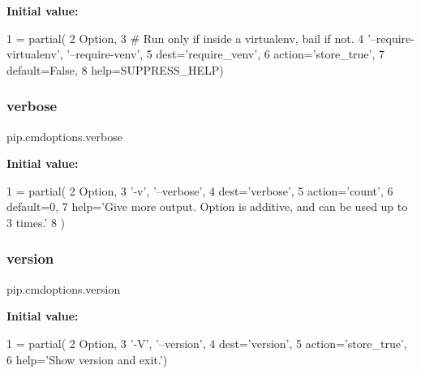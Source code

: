 {\bfseries Initial value\+:}
\begin{DoxyCode}
1 =  partial(
2     Option,
3     \textcolor{comment}{# Run only if inside a virtualenv, bail if not.}
4     \textcolor{stringliteral}{'--require-virtualenv'}, \textcolor{stringliteral}{'--require-venv'},
5     dest=\textcolor{stringliteral}{'require\_venv'},
6     action=\textcolor{stringliteral}{'store\_true'},
7     default=\textcolor{keyword}{False},
8     help=SUPPRESS\_HELP)
\end{DoxyCode}
\mbox{\label{namespacepip_1_1cmdoptions_a571cf3fd897e4144f1f3fff1e586f8bf}} 
\subsubsection{\texorpdfstring{verbose}{verbose}}
{\footnotesize\ttfamily pip.\+cmdoptions.\+verbose}

{\bfseries Initial value\+:}
\begin{DoxyCode}
1 =  partial(
2     Option,
3     \textcolor{stringliteral}{'-v'}, \textcolor{stringliteral}{'--verbose'},
4     dest=\textcolor{stringliteral}{'verbose'},
5     action=\textcolor{stringliteral}{'count'},
6     default=0,
7     help=\textcolor{stringliteral}{'Give more output. Option is additive, and can be used up to 3 times.'}
8 )
\end{DoxyCode}
\mbox{\label{namespacepip_1_1cmdoptions_ad58e65e658b9115f6c082d4506cea1a5}} 
\subsubsection{\texorpdfstring{version}{version}}
{\footnotesize\ttfamily pip.\+cmdoptions.\+version}

{\bfseries Initial value\+:}
\begin{DoxyCode}
1 =  partial(
2     Option,
3     \textcolor{stringliteral}{'-V'}, \textcolor{stringliteral}{'--version'},
4     dest=\textcolor{stringliteral}{'version'},
5     action=\textcolor{stringliteral}{'store\_true'},
6     help=\textcolor{stringliteral}{'Show version and exit.'})
\end{DoxyCode}
